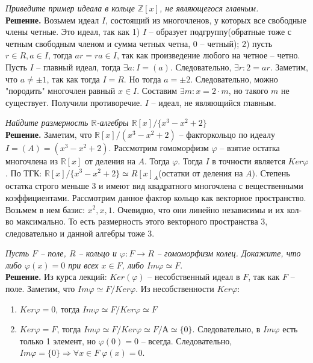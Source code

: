\documentclass[a4paper, 12pt]{article}
\newcommand{\R}{\mathbb{R}}
\newcommand{\Z}{\mathbb{Z}}
\begin{document}
\begin{spacing}{1}
\newpage
\begin{center}
\end{center}

\noindent \textit{Приведите пример идеала в кольце $\Z[x]$, не являющегося главным.}\\
\noindent \textbf{Решение.} Возьмем идеал $I$, состоящий из многочленов, у которых все свободные члены четные. Это идеал, так как 1) $I$ -- образует подгруппу(обратные тоже с четным свободным членом и сумма четных четна, 0 -- четный); 2) пусть $r\in R, a \in I$, тогда $ar=ra\in I$, так как произведение любого на четное -- четно. Пусть $I$ -- главный идеал, тогда $\exists a : I = (a)$. Следовательно, $\exists r : 2 = ar$. Заметим, что $a \neq \pm 1$, так как тогда $I = R$. Но тогда $a = \pm 2$. Следовательно, можно "породить" многочлен равный $x \in I$. Составим $\exists m : x = 2 \cdot m$, но такого $m$ не существует. Получили противоречие. $I$ -- идеал, не являющийся главным.


\begin{center}
\end{center}

\noindent \textit{Найдите размерность $\R$-алгебры $\R[x]/\{x^3-x^2+2\}$}\\
\noindent \textbf{Решение.} Заметим, что $\R[x]/(x^3-x^2+2)$ -- факторкольцо по идеалу $I = (A) = (x^3-x^2+2)$. Рассмотрим гомоморфизм $\varphi$ -- взятие остатка многочлена из $\R[x]$ от деления на $A$. Тогда $\varphi$. Тогда $I$ в точности является $Ker\varphi$. По ТГК: $\R[x]/\{x^3-x^2+2\} \simeq R[x]_A$(остатки от деления на $A$). Степень остатка строго меньше 3 и имеют вид квадратного многочлена с вещественными коэффициентами. Рассмотрим данное фактор кольцо как векторное пространство. Возьмем в нем базис: $x^2, x, 1$. Очевидно, что они линейно независимы и их кол-во максимально. То есть размерность этого векторного пространства 3, следовательно и данной алгебры тоже 3.




\begin{center}
\end{center}

\noindent \textit{Пусть $F$ -- поле, $R$ -- кольцо и $\varphi: F \rightarrow R$ -- гомоморфизм колец. Докажите, что либо $\varphi(x) = 0$ при всех $x\in F$, либо $Im\varphi \simeq F.$}\\
\noindent \textbf{Решение.} Из курса лекций: $Ker(\varphi)$ -- несобственный идеал в $F$, так как $F$ -- поле. Заметим, что $Im\varphi \simeq F/Ker\varphi$. Из несобственности $Ker\varphi$:
\begin{enumerate}
	\item $Ker\varphi = 0$, тогда $Im\varphi \simeq F/Ker\varphi \simeq F$
	\item $Ker\varphi = F$, тогда $Im\varphi \simeq F/Ker\varphi \simeq F/А \simeq \{0\}$. Следовательно, в $Im\varphi$ есть только 1 элемент, но $\varphi(0) = 0$ -- всегда. Следовательно, $Im\varphi  = \{0\}\Rightarrow \forall x\in F\;\varphi(x) = 0$.
\end{enumerate}






\end{spacing}
\end{document}
